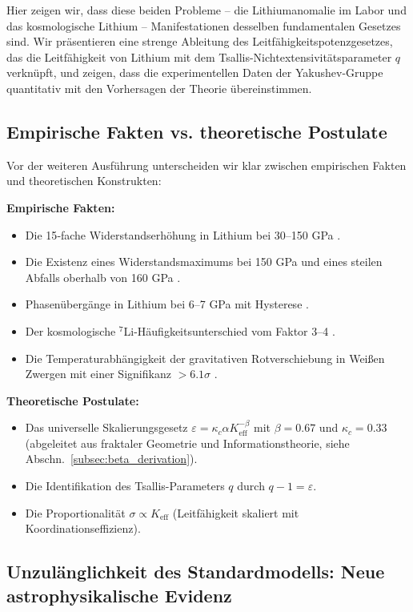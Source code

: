 \documentclass[12pt,a4paper]{article}
\theoremstyle{remark}
\newcommand{\Ke}{K_{\mathrm{eff}}}
\newcommand{\kappac}{\kappa_c}
\newcommand{\alp}{\alpha}
\begin{document}
	Hier zeigen wir, dass diese beiden Probleme – die Lithiumanomalie im Labor und das kosmologische Lithium – Manifestationen desselben fundamentalen Gesetzes sind. Wir präsentieren eine strenge Ableitung des Leitfähigkeitspotenzgesetzes, das die Leitfähigkeit von Lithium mit dem Tsallis-Nichtextensivitätsparameter \(q\) verknüpft, und zeigen, dass die experimentellen Daten der Yakushev-Gruppe \cite{fortov2001, yakushev2002} quantitativ mit den Vorhersagen der Theorie übereinstimmen.
	
	\subsection{Empirische Fakten vs. theoretische Postulate}
	
	Vor der weiteren Ausführung unterscheiden wir klar zwischen empirischen Fakten und theoretischen Konstrukten:
	
	\textbf{Empirische Fakten:}
	\begin{itemize}
		\item Die 15‑fache Widerstandserhöhung in Lithium bei 30–150 GPa \cite{fortov2001}.
		\item Die Existenz eines Widerstandsmaximums bei 150 GPa und eines steilen Abfalls oberhalb von 160 GPa \cite{yakushev2002}.
		\item Phasenübergänge in Lithium bei 6–7 GPa mit Hysterese \cite{orlov2001}.
		\item Der kosmologische \(^7\)Li-Häufigkeitsunterschied vom Faktor 3–4 \cite{bertulani2015}.
		\item Die Temperaturabhängigkeit der gravitativen Rotverschiebung in Weißen Zwergen mit einer Signifikanz \(>6.1\sigma\) \cite{Crumpler2024}.
	\end{itemize}
	
	\textbf{Theoretische Postulate:}
	\begin{itemize}
		\item Das universelle Skalierungsgesetz \(\varepsilon = \kappac \alp \Ke^{-\beta}\) mit \(\beta = 0.67\) und \(\kappac = 0.33\) (abgeleitet aus fraktaler Geometrie und Informationstheorie, siehe Abschn.~\ref{subsec:beta_derivation}).
		\item Die Identifikation des Tsallis-Parameters \(q\) durch \(q-1 = \varepsilon\).
		\item Die Proportionalität \(\sigma \propto \Ke\) (Leitfähigkeit skaliert mit Koordinationseffizienz).
	\end{itemize}
	
	\subsection{Unzulänglichkeit des Standardmodells: Neue astrophysikalische Evidenz}
	\label{subsec:std-inadequacy}
	
\end{document}
